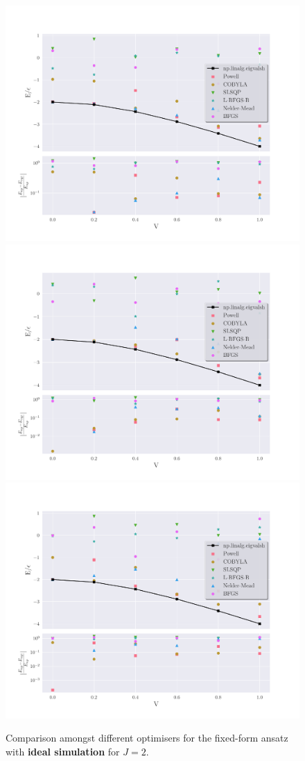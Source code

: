 \begin{figure}[h]
	\centering
	\includegraphics[width=0.32\linewidth]{image/lipkin_result/vqe-opt/cmp_opt_vqe_ee1000_J=2.pdf}
	\includegraphics[width=0.32\linewidth]{image/lipkin_result/vqe-opt/cmp_opt_vqe_ee10000_J=2.pdf}
	\includegraphics[width=0.32\linewidth]{image/lipkin_result/vqe-opt/cmp_opt_vqe_ee100000_J=2.pdf}
	\caption{Comparison amongst different optimisers for the fixed-form ansatz with \textbf{ideal simulation} for $ J=2 $.}
	\label{fig:OptHW2}
\end{figure}

